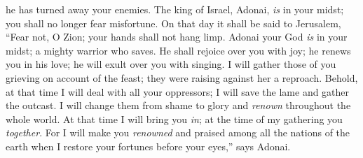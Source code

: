\begin{biblechapter}
he has turned away your enemies. 
The king of Israel, Adonai, \textit{is} in your midst; 
you shall no longer fear misfortune.
\verse On that day it shall be said to Jerusalem, 
“Fear not, O Zion; 
your hands shall not hang limp.
\verse Adonai your God \textit{is} in your midst; 
a mighty warrior who saves. 
He shall rejoice over you with joy; 
he renews you in his love; 
he will exult over you with singing.
\verse I will gather those of you grieving on account of the feast; 
they were raising against her a reproach.
\verse Behold, at that time I will deal with all your oppressors; 
I will save the lame and gather the outcast. 
I will change them from shame 
to glory and \textit{renown} throughout the whole world.
\verse At that time I will bring you \textit{in}; 
at the time of my gathering you \textit{together}. 
For I will make you \textit{renowned} and praised 
among all the nations of the earth 
when I restore your fortunes before your eyes,” 
says Adonai.
\end{biblechapter}

